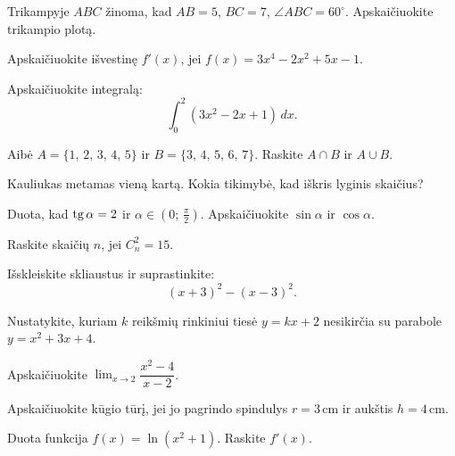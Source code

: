 \begin{exercise}
Trikampyje $ABC$ žinoma, kad $AB = 5$, $BC = 7$, $\angle ABC = 60^\circ$.
Apskaičiuokite trikampio plotą.
\end{exercise}

\begin{exercise}
Apskaičiuokite išvestinę $f'(x)$, jei $f(x) = 3x^4 - 2x^2 + 5x - 1$.
\end{exercise}

\begin{exercise}
Apskaičiuokite integralą:
\[
\int_0^2 (3x^2 - 2x + 1)\,dx.
\]
\end{exercise}

\begin{exercise}
Aibė $A = \{1,\, 2,\, 3,\, 4,\, 5\}$ ir $B = \{3,\, 4,\, 5,\, 6,\, 7\}$.
Raskite $A \cap B$ ir $A \cup B$.
\end{exercise}

\begin{exercise}
Kauliukas metamas vieną kartą. Kokia tikimybė, kad iškris lyginis skaičius?
\end{exercise}

\begin{exercise}
Duota, kad $\operatorname{tg} \alpha = 2$ ir $\alpha \in \left(0;\, \tfrac{\pi}{2}\right)$.
Apskaičiuokite $\sin \alpha$ ir $\cos \alpha$.
\end{exercise}

\begin{exercise}
Raskite skaičių $n$, jei $C_n^2 = 15$.
\end{exercise}

\begin{exercise}
Išskleiskite skliaustus ir suprastinkite:
\[
(x + 3)^2 - (x - 3)^2.
\]
\end{exercise}

\begin{exercise}
Nustatykite, kuriam $k$ reikšmių rinkiniui tiesė $y = kx + 2$ nesikirčia su
parabole $y = x^2 + 3x + 4$.
\end{exercise}

\begin{exercise}
Apskaičiuokite $\lim_{x \to 2} \dfrac{x^2 - 4}{x - 2}$.
\end{exercise}

\begin{exercise}
Apskaičiuokite kūgio tūrį, jei jo pagrindo spindulys $r = 3$\,cm ir aukštis
$h = 4$\,cm.
\end{exercise}

\begin{exercise}
Duota funkcija $f(x) = \ln(x^2 + 1)$. Raskite $f'(x)$.
\end{exercise}


